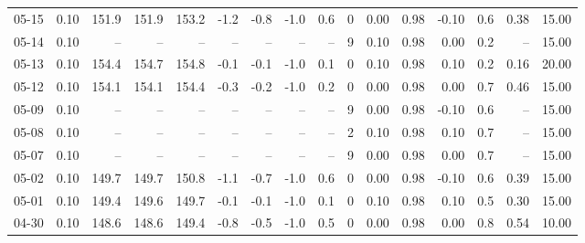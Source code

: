 \begin{threeparttable}
{\begin{tabular}{lrrrrrrrrrrrrrrr}
  05-15 &     0.10 & 151.9 & 151.9 & 153.2 &       -1.2 &           -0.8 &                     -1.0 &                 0.6 &              0 &       0.00 &      0.98 &          -0.10 &              0.6 &            0.38 &                  15.00 \\
  05-14 &     0.10 &    -- &    -- &    -- &         -- &             -- &                       -- &                  -- &              9 &       0.10 &      0.98 &           0.00 &              0.2 &              -- &                  15.00 \\
  05-13 &     0.10 & 154.4 & 154.7 & 154.8 &       -0.1 &           -0.1 &                     -1.0 &                 0.1 &              0 &       0.10 &      0.98 &           0.10 &              0.2 &            0.16 &                  20.00 \\
  05-12 &     0.10 & 154.1 & 154.1 & 154.4 &       -0.3 &           -0.2 &                     -1.0 &                 0.2 &              0 &       0.00 &      0.98 &           0.00 &              0.7 &            0.46 &                  15.00 \\
  05-09 &     0.10 &    -- &    -- &    -- &         -- &             -- &                       -- &                  -- &              9 &       0.00 &      0.98 &          -0.10 &              0.6 &              -- &                  15.00 \\
  05-08 &     0.10 &    -- &    -- &    -- &         -- &             -- &                       -- &                  -- &              2 &       0.10 &      0.98 &           0.10 &              0.7 &              -- &                  15.00 \\
  05-07 &     0.10 &    -- &    -- &    -- &         -- &             -- &                       -- &                  -- &              9 &       0.00 &      0.98 &           0.00 &              0.7 &              -- &                  15.00 \\
  05-02 &     0.10 & 149.7 & 149.7 & 150.8 &       -1.1 &           -0.7 &                     -1.0 &                 0.6 &              0 &       0.00 &      0.98 &          -0.10 &              0.6 &            0.39 &                  15.00 \\
  05-01 &     0.10 & 149.4 & 149.6 & 149.7 &       -0.1 &           -0.1 &                     -1.0 &                 0.1 &              0 &       0.10 &      0.98 &           0.10 &              0.5 &            0.30 &                  15.00 \\
  04-30 &     0.10 & 148.6 & 148.6 & 149.4 &       -0.8 &           -0.5 &                     -1.0 &                 0.5 &              0 &       0.00 &      0.98 &           0.00 &              0.8 &            0.54 &                  10.00 \\

\end{tabular}}
\end{threeparttable}
